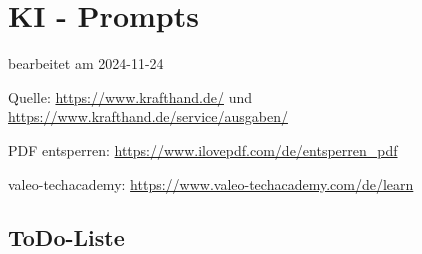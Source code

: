 \documentclass{vorlage-design-main}
\title{}
\author{Jan Unger}
\date{\today}
\begin{document}
\maketitle

\begin{abstract}



\end{abstract}

\section{KI - Prompts}\label{ki---prompts}

bearbeitet am 2024-11-24

Quelle: \url{https://www.krafthand.de/} und
\url{https://www.krafthand.de/service/ausgaben/}

PDF entsperren: \url{https://www.ilovepdf.com/de/entsperren_pdf}

valeo-techacademy: \url{https://www.valeo-techacademy.com/de/learn}

\subsection{ToDo-Liste}\label{todo-liste}
\end{document}
